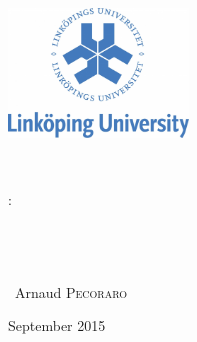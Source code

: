 \begin{titlepage}
\thispagestyle{empty}
\begin{center}

\begin{minipage}[t]{0.48\textwidth}
  \begin{flushleft}
    \includegraphics [width=48mm]{images/logo-univ.jpg} \\[0.5cm]

  \end{flushleft}
\end{minipage}
\begin{minipage}[t]{0.48\textwidth}
  \begin{flushright}

  \end{flushright}
\end{minipage} \\[1.0cm] %

\vspace{5.3cm}

\textsc{\Large \reportsubject :}\\[2cm]

\HRule \\[0.4cm]
{\Large \bfseries \reporttitle}\\[0.4cm]
\HRule \\[1.5cm]

\vspace{1.5cm}

\vspace{4.5cm}
\begin{minipage}[t]{0.30\textwidth}
  \begin{flushleft} \normalsize
     ~Arnaud \textsc{Pecoraro} \\
 \end{flushleft}
\end{minipage}
\begin{minipage}[t]{0.6\textwidth}
  \begin{flushright} \normalsize

  \end{flushright}
\end{minipage}

\vfill
\vspace*{0.440cm}
{\large September 2015 }

\end{center}
\end{titlepage}
